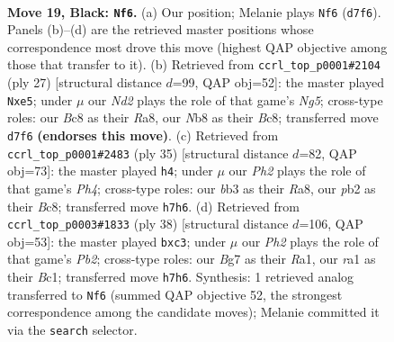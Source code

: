 \documentclass[11pt]{article}
\begin{document}
\clearpage

\begin{figure}[p]\centering
\begin{subfigure}{0.46\textwidth}\centering
\resizebox{\linewidth}{!}{%
\newchessgame
\chessboard[
  setfen={rnb1r2k/pppnp1bp/6P1/P1P4R/8/1B3N2/1P3P2/RNB1K3 b Q - 0 19},
  showmover=false,
  pgfstyle=straightmove, color=movearrow, markmove={d7-f6}
]}
\caption{}
\end{subfigure}\hfill
\begin{subfigure}{0.46\textwidth}\centering
\resizebox{\linewidth}{!}{%
\newchessgame
\chessboard[
  setfen={r1b1r2k/ppp1p1bp/6p1/3BP3/6n1/2P3P1/PP2P2P/RNB2RK1 b - - 0 14},
  showmover=false,
  pgfstyle=straightmove, color=movearrow, markmove={g4-e5}
]}
\caption{}
\end{subfigure}
\\[4pt]
\begin{subfigure}{0.46\textwidth}\centering
\resizebox{\linewidth}{!}{%
\newchessgame
\chessboard[
  setfen={r1b1k2r/pp1n1p2/3b4/3p2pp/N2N2P1/4PP2/PP4P1/R2K1B1R b kq - 0 18},
  showmover=false,
  pgfstyle=straightmove, color=movearrow, markmove={h5-h4}
]}
\caption{}
\end{subfigure}\hfill
\begin{subfigure}{0.46\textwidth}\centering
\resizebox{\linewidth}{!}{%
\newchessgame
\chessboard[
  setfen={r2r1k2/5ppp/2p2n2/p1b1p3/P1B1P3/2p2P2/1P2K1PP/R1B1R3 w - - 0 20},
  showmover=false,
  pgfstyle=straightmove, color=movearrow, markmove={b2-c3}
]}
\caption{}
\end{subfigure}
\caption{\textbf{Move 19, Black: \texttt{Nf6}.} (a) Our position; Melanie plays \texttt{Nf6} (\texttt{d7f6}). Panels (b)--(d) are the retrieved master positions whose correspondence most drove this move (highest QAP objective among those that transfer to it). (b) Retrieved from \texttt{ccrl\_top\_p0001\#2104} (ply 27) [structural distance $d$=99, QAP obj=52]: the master played \texttt{Nxe5}; under $\mu$ our \emph{Nd2} plays the role of that game's \emph{Ng5}; cross-type roles: our \emph{B}c8 as their \emph{R}a8, our \emph{N}b8 as their \emph{B}c8; transferred move \texttt{d7f6} \textbf{(endorses this move)}. (c) Retrieved from \texttt{ccrl\_top\_p0001\#2483} (ply 35) [structural distance $d$=82, QAP obj=73]: the master played \texttt{h4}; under $\mu$ our \emph{Ph2} plays the role of that game's \emph{Ph4}; cross-type roles: our \emph{b}b3 as their \emph{R}a8, our \emph{p}b2 as their \emph{B}c8; transferred move \texttt{h7h6}. (d) Retrieved from \texttt{ccrl\_top\_p0003\#1833} (ply 38) [structural distance $d$=106, QAP obj=53]: the master played \texttt{bxc3}; under $\mu$ our \emph{Ph2} plays the role of that game's \emph{Pb2}; cross-type roles: our \emph{B}g7 as their \emph{R}a1, our \emph{r}a1 as their \emph{B}c1; transferred move \texttt{h7h6}. Synthesis: 1 retrieved analog transferred to \texttt{Nf6} (summed QAP objective 52, the strongest correspondence among the candidate moves); Melanie committed it via the \texttt{search} selector.}
\label{fig:thought-m37}
\end{figure}
\end{document}
